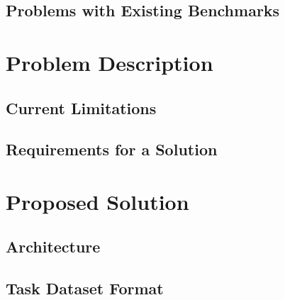 \section{Problems with Existing Benchmarks}

\chapter{Problem Description}
\section{Current Limitations}

\section{Requirements for a Solution}

\chapter{Proposed Solution}

\section{Architecture}

\section{Task Dataset Format}

